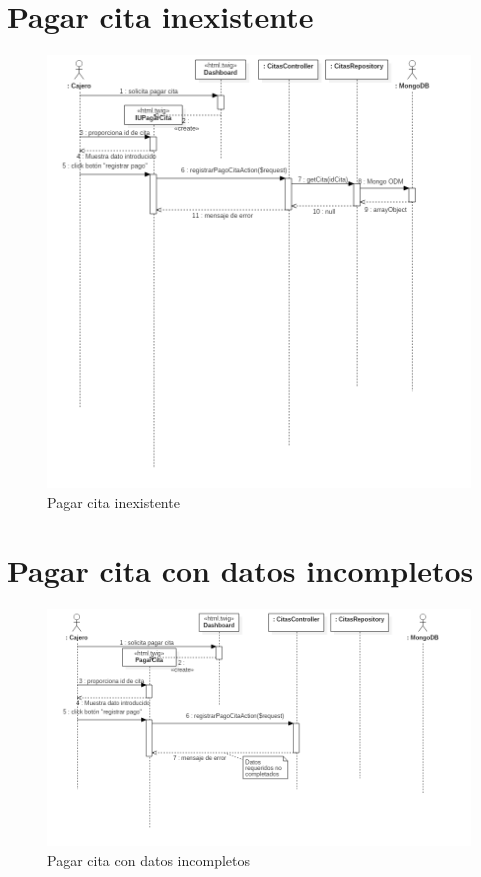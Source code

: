 \section{Pagar cita inexistente}

\begin{figure}[htbp!]
	\centering
	\includegraphics[width=1\textwidth]{uml/DiagramasSecuencia/DavidPacheco/pagar-cita-cita-no-existe}
	\caption{Pagar cita inexistente}
\end{figure}

\section{Pagar cita con datos incompletos}

\begin{figure}[htbp!]
	\centering
	\includegraphics[width=1\textwidth]{uml/DiagramasSecuencia/DavidPacheco/pagar-cita-datos-incompletos}
	\caption{Pagar cita con datos incompletos}
\end{figure}

